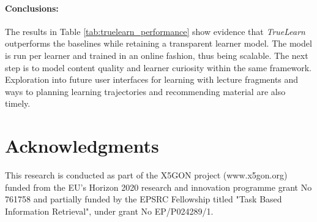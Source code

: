 \documentclass[letterpaper]{article} %
\begin{document}
\paragraph{Conclusions:} The results in Table \ref{tab:truelearn_performance} show evidence that \emph{TrueLearn} outperforms the baselines while retaining a transparent learner model. The model is run per learner and trained in an online fashion, thus being scalable. The next step is to model content quality and learner curiosity within the same framework. Exploration into future user interfaces for learning with lecture fragments and ways to planning learning trajectories and recommending material are also timely.

\section{Acknowledgments}
 This research is conducted as part of the X5GON project (www.x5gon.org) funded from the EU's Horizon 2020 research and innovation programme grant No 761758 and partially funded by the EPSRC Fellowship titled "Task Based Information Retrieval", under grant No EP/P024289/1.

\end{document}
